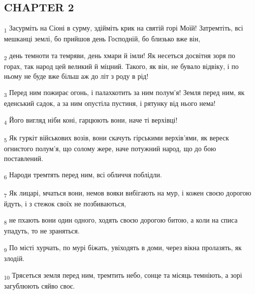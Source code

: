 \subsection{CHAPTER 2}
\begin{tcolorbox}
\textsubscript{1} Засурміть на Сіоні в сурму, здійміть крик на святій горі Моїй! Затремтіть, всі мешканці землі, бо прийшов день Господній, бо близько вже він,
\end{tcolorbox}
\begin{tcolorbox}
\textsubscript{2} день темноти та темряви, день хмари й імли! Як несеться досвітня зоря по горах, так народ цей великий й міцний. Такого, як він, не бувало відвіку, і по ньому не буде вже більш аж до літ з роду в рід!
\end{tcolorbox}
\begin{tcolorbox}
\textsubscript{3} Перед ним пожирає огонь, і палахкотить за ним полум'я! Земля перед ним, як еденський садок, а за ним опустіла пустиня, і рятунку від нього нема!
\end{tcolorbox}
\begin{tcolorbox}
\textsubscript{4} Його вигляд ніби коні, гарцюють вони, наче ті верхівці!
\end{tcolorbox}
\begin{tcolorbox}
\textsubscript{5} Як гуркіт військових возів, вони скачуть гірськими верхів'ями, як вереск огнистого полум'я, що солому жере, наче потужний народ, що до бою поставлений.
\end{tcolorbox}
\begin{tcolorbox}
\textsubscript{6} Народи тремтять перед ним, всі обличчя поблідли.
\end{tcolorbox}
\begin{tcolorbox}
\textsubscript{7} Як лицарі, мчаться вони, немов вояки вибігають на мур, і кожен своєю дорогою йдуть, і з стежок своїх не позбиваються,
\end{tcolorbox}
\begin{tcolorbox}
\textsubscript{8} не пхають вони один одного, ходять своєю дорогою битою, а коли на списа упадуть, то не зраняться.
\end{tcolorbox}
\begin{tcolorbox}
\textsubscript{9} По місті хурчать, по мурі біжать, увіходять в доми, через вікна пролазять, як злодій.
\end{tcolorbox}
\begin{tcolorbox}
\textsubscript{10} Трясеться земля перед ним, тремтить небо, сонце та місяць темніють, а зорі загублюють сяйво своє.
\end{tcolorbox}
